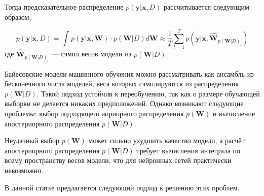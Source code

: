 \documentclass{article}
\begin{document}
Тогда предсказательное распределение $p(\pmb{y} | \pmb{x}, D)$ рассчитывается следующим образом:

\[
p(\pmb{y} | \pmb{x}, D) =
\int_{}{} p(\pmb{y} | \pmb{x}, \pmb{W}) \cdot p(\pmb{W} | D) d \pmb{W}
\approx \dfrac{1}{T} \sum_{t=1}^{T}{p(\pmb{y} | \pmb{x}, \hat{\pmb{W}}_{p(\pmb{W} | D)_{t}})}
\]
где $\hat{\pmb{W}}_{p(\pmb{W} | D)_{t}}$ --- сэмпл весов модели из $p(\pmb{W}| D)$.

Байесовские модели машинного обучения можно рассматривать как ансамбль из бесконечного числа моделей, веса которых сэмплируются из распределения $p(\pmb{W}| D)$. Такой подход устойчив к переобучению, так как о размере обучающей выборки не делается никаких предположений. Однако возникают следующие проблемы: выбор подходящего априорного распределения $p(\pmb{W})$ и вычисление апостериорного распределения $p(\pmb{W}| D)$.

Неудачный выбор $p(\pmb{W})$ может сильно ухудшить качество модели, а расчёт апостериорного распределения $p(\pmb{W}| D)$ требует вычисления интеграла по всему пространству весов модели, что для нейронных сетей практически невозможно.

В данной статье предлагается следующий подход к решению этих проблем.
\end{document}
